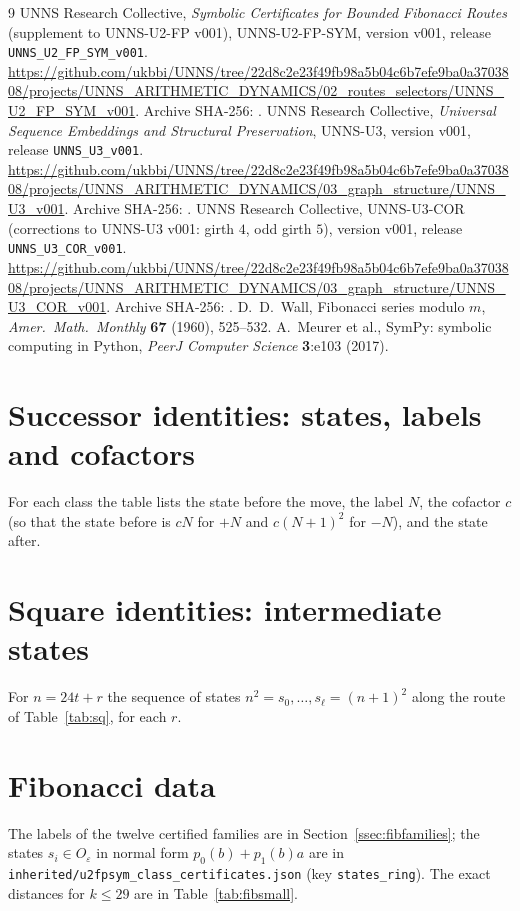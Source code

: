 \begin{thebibliography}{9}
 UNNS Research Collective, \emph{Symbolic Certificates for Bounded Fibonacci Routes} (supplement to UNNS-U2-FP v001), UNNS-U2-FP-SYM, version v001, release \texttt{UNNS\_U2\_FP\_SYM\_v001}. \url{https://github.com/ukbbi/UNNS/tree/22d8c2e23f49fb98a5b04c6b7efe9ba0a3703808/projects/UNNS_ARITHMETIC_DYNAMICS/02_routes_selectors/UNNS_U2_FP_SYM_v001}. Archive SHA-256: .
 UNNS Research Collective, \emph{Universal Sequence Embeddings and Structural Preservation}, UNNS-U3, version v001, release \texttt{UNNS\_U3\_v001}. \url{https://github.com/ukbbi/UNNS/tree/22d8c2e23f49fb98a5b04c6b7efe9ba0a3703808/projects/UNNS_ARITHMETIC_DYNAMICS/03_graph_structure/UNNS_U3_v001}. Archive SHA-256: .
 UNNS Research Collective, UNNS-U3-COR (corrections to UNNS-U3 v001: girth $4$, odd girth $5$), version v001, release \texttt{UNNS\_U3\_COR\_v001}. \url{https://github.com/ukbbi/UNNS/tree/22d8c2e23f49fb98a5b04c6b7efe9ba0a3703808/projects/UNNS_ARITHMETIC_DYNAMICS/03_graph_structure/UNNS_U3_COR_v001}. Archive SHA-256: .
 D.~D.~Wall, Fibonacci series modulo $m$, \emph{Amer.\ Math.\ Monthly} \textbf{67} (1960), 525--532.
 A.~Meurer et al., SymPy: symbolic computing in Python, \emph{PeerJ Computer Science} \textbf{3}:e103 (2017).
\end{thebibliography}
\endgroup

\appendix
\section{Successor identities: states, labels and cofactors}\label{app:succ}
For each class the table lists the state before the move, the label $N$, the cofactor $c$ (so that the state before is $cN$ for $+N$ and $c(N+1)^2$ for $-N$), and the state after.


\section{Square identities: intermediate states}\label{app:sq}
For $n=24t+r$ the sequence of states $n^2=s_0,\dots,s_\ell=(n+1)^2$ along the route of Table~\ref{tab:sq}, for each $r$.


\section{Fibonacci data}\label{app:fib}
The labels of the twelve certified families are in Section~\ref{ssec:fibfamilies}; the states $s_i\in O_\varepsilon$ in normal form $p_0(b)+p_1(b)a$ are in \texttt{inherited/u2fpsym\_class\_certificates.json} (key \texttt{states\_ring}). The exact distances for $k\le29$ are in Table~\ref{tab:fibsmall}.

